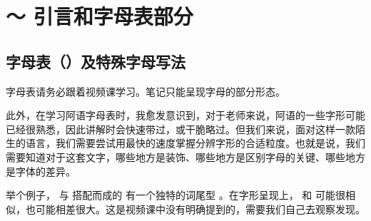 \chapter{ ～  引言和字母表部分}

\section{字母表（）及特殊字母写法}

\begin{note}
    字母表请务必跟着视频课学习。笔记只能呈现字母的部分形态。

    此外，在学习阿语字母表时，我愈发意识到，对于老师来说，阿语的一些字形可能已经很熟悉，因此讲解时会快速带过，或干脆略过。但我们来说，面对这样一款陌生的语言，我们需要尝试用最快的速度掌握分辨字形的合适粒度。也就是说，我们需要知道对于这套文字，哪些地方是装饰、哪些地方是区别字母的关键、哪些地方是字体的差异。

    举个例子， 与  搭配而成的  有一个独特的词尾型 。在字形呈现上，  和  可能很相似，也可能相差很大。这是视频课中没有明确提到的，需要我们自己去观察发现。
\end{note}

